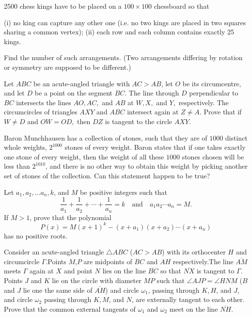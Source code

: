 \documentclass[11pt]{scrartcl}
\begin{document}
\begin{problem}[8971817929368411167]
2500 chess kings have to be placed on a $100 \times 100$ chessboard so that

(i) no king can capture any other one (i.e. no two kings are placed in two squares sharing a common vertex);
(ii) each row and each column contains exactly 25 kings.

Find the number of such arrangements. (Two arrangements differing by rotation or symmetry are supposed to be different.)
\end{problem}
\begin{problem}[282712203118607]
	Let $ABC$ be an acute-angled triangle with $AC > AB$, let $O$ be its circumcentre, and let $D$ be a point on the segment $BC$. The line through $D$ perpendicular to $BC$ intersects the lines $AO, AC,$ and $AB$ at $W, X,$ and $Y,$ respectively. The circumcircles of triangles $AXY$ and $ABC$ intersect again at $Z \ne A$.
Prove that if $W \ne D$ and $OW = OD,$ then $DZ$ is tangent to the circle $AXY.$
\end{problem}
\begin{problem}[9055967412808709037]
Baron Munchhausen has a collection of stones, such that they are of $1000$ distinct whole weights, $2^{1000}$ stones of every weight. Baron states that if one takes exactly one stone of every weight, then the weight of all these $1000$ stones chosen will be less than $2^{1010}$, and there is no other way to obtain this weight by picking another set of stones of the collection.
Can this statement happen to be true?
\end{problem}
\begin{problem}[835565816078264]
Let $a_1,a_2,\ldots a_n,k$, and $M$ be positive integers such that
$$\frac{1}{a_1}+\frac{1}{a_2}+\cdots+\frac{1}{a_n}=k\quad\text{and}\quad a_1a_2\cdots a_n=M.$$If $M>1$, prove that the polynomial
$$P(x)=M(x+1)^k-(x+a_1)(x+a_2)\cdots (x+a_n)$$has no positive roots.
\end{problem}
\begin{problem}[1986632843459004559]
Consider an acute-angled triangle $\triangle ABC$ ($AC>AB$) with its orthocenter $H$ and circumcircle $\Gamma$.Points $M$,$P$ are midpoints of $BC$ and $AH$ respectively.The line $\overline{AM}$ meets $\Gamma$ again at $X$ and point $N$ lies on the line $\overline{BC}$ so that $\overline{NX}$ is tangent to $\Gamma$.
Points $J$ and $K$ lie on the circle with diameter $MP$ such that $\angle AJP=\angle HNM$ ($B$ and $J$ lie one the same side of $\overline{AH}$) and circle $\omega_1$, passing through $K,H$, and $J$, and circle $\omega_2$ passing through $K,M$, and $N$, are externally tangent to each other. Prove that the common external tangents of $\omega_1$ and $\omega_2$ meet on the line $\overline{NH}$.
\end{problem}
\end{document}
